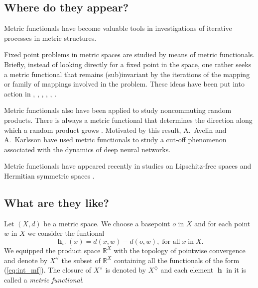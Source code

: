 \documentclass[a4paper,12pt]{article}
\theoremstyle{definition}
\DeclareMathOperator{\h}{\mathbf{h}}
\newcommand{\R}{\mathbb{R}}
\numberwithin{equation}{section}
\begin{document}
\subsection{Where do they appear?}

Metric functionals have become valuable tools in investigations of iterative 
processes in metric structures. 

Fixed point problems in metric spaces are studied by means of metric functionals. 
Briefly, instead of looking directly for a fixed point in the space, one rather 
seeks a metric functional that remains (sub)invariant by the iterations of the 
mapping or family of mappings involved in the problem. These ideas have been put 
into action in 
\cite{Gaubert-Vigeral2012}, \cite{Lemmens-Lins-Nussbaum2018}, 
\cite{Gutierrez-Karlsson2021}, \cite{Lins2022}, \cite{Karlsson2023}, 
\cite{Gutierrez-Nevanlinna2024}. 

Metric functionals also have been applied to study noncommuting random products. 
There is always a metric functional that determines the direction along which a 
random product grows \cite{Gouezel-Karlsson2020}. Motivated by this result, 
A.~Avelin and A.~Karlsson \cite{Avelin-Karlsson2022} have used metric 
functionals to study a cut-off phenomenon associated with the dynamics of deep 
neural networks.

Metric functionals have appeared recently in studies on Lipschitz-free spaces 
\cite{Megrelishvili2025} and Hermitian symmetric spaces 
\cite{Chu-Cueto-Lemmens2024}.

\subsection{What are they like?}\label{ssec:Construction}

Let $(X,d)$ be a metric space. We choose a basepoint $o$ in $X$ and for each point 
$w$ in $X$ we consider the funtional 
\begin{equation}\label{eq:int_mf}
	\h_w(x) = d(x,w)-d(o,w),\;\text{for all}\;x\;\text{in}\;X.
\end{equation}
We equipped the product space $\R^X$ with the topology of pointwise convergence 
and denote by $X^{\vee}$ the subset of $\R^X$ containing all the functionals of 
the form (\ref{eq:int_mf}). The closure of $X^{\vee}$ is denoted by 
$X^{\diamondsuit}$ and each element $\h$ in it is called a 
\emph{metric functional}.
\end{document}
